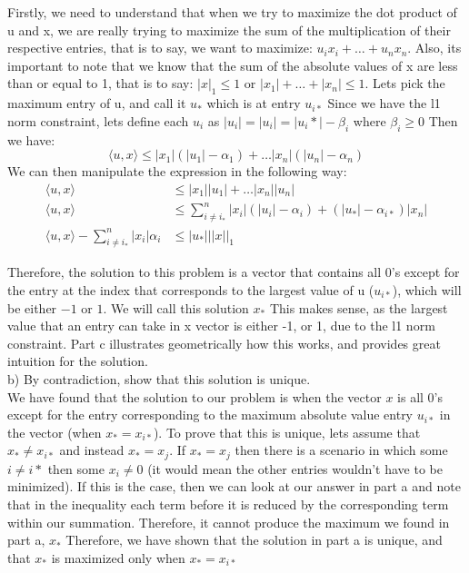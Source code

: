 \documentclass[12pt,twoside]{article}
\begin{document}
 Firstly, we need to understand that when we try to maximize the dot product of u and x, we are really trying to maximize the sum of the multiplication of their respective entries, that is to say, we want to maximize: $u_ix_i + \dots + u_nx_n$. Also, its important to note that we know that the sum of the absolute values of x are less than or equal to 1, that is to say: $|x|_1 \leq 1$ or $|x_1| + \dots + |x_n| \leq 1$. Lets pick the maximum entry of u, and call it $u_*$ which is at entry $u_{i*}$ Since we have the l1 norm constraint, lets define each $u_i$ as $|u_i| = |u_i| = |u_i*| - \beta_i$ where $\beta_i \geq 0$ Then we have:
 $$
    \langle u, x \rangle \leq |x_1|(|u_1|-\alpha_1) + \dots |x_n|(|u_n| - \alpha_n)
 $$
We can then manipulate the expression in the following way:
\begin{equation}
    \begin{split}
        \langle u, x \rangle &\leq |x_1||u_1| + \dots |x_n||u_n| \\
        \langle u, x \rangle &\leq  \sum_{i \neq i_*}^n |x_i|(|u_i|-\alpha_i) + (|u_*| - \alpha_{i*})|x_n| \\ 
        \langle u, x \rangle - \sum_{i \neq i_*}^n |x_i|\alpha_i &\leq |u_*|||x||_1
    \end{split}
\end{equation}

Therefore, the solution to this problem is a vector that contains all 0's except for the entry at the index that corresponds to the largest value of u ($u_{i*}$), which will be either $-1$ or $1$. We will call this solution $x_*$ This makes sense, as the largest value that an entry can take in x vector is either -1, or 1, due to the l1 norm constraint. Part c illustrates geometrically how this works, and provides great intuition for the solution.\\

b) By contradiction, show that this solution is unique.\\

We have found that the solution to our problem is when the vector $x$ is all 0's except for the entry corresponding to the maximum absolute value entry $u_{i*}$ in the vector (when $x_*=x_{i*}$). To prove that this is unique, lets assume that $x_* \neq x_{i*}$ and instead $x_* = x_j$. If $x_* = x_j$ then there is a scenario in which some $i\neq i*$ then some $x_i \neq 0$ (it would mean the other entries wouldn't have to be minimized). If this is the case, then we can look at our answer in part a and note that in the inequality each term before it is reduced by the corresponding term within our summation. Therefore, it cannot produce the maximum we found in part a, $x_*$ Therefore, we have shown that the solution in part a is unique, and that $x_*$ is maximized only when $x_* = x_{i*}$  \\
\end{document}
